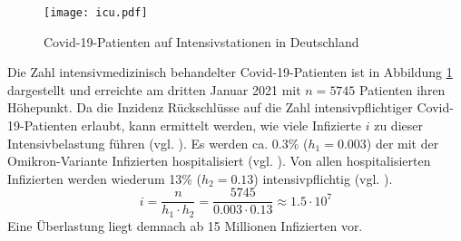 \documentclass[../main.tex]{subfiles}
\begin{document}
    \begin{figure}[b]
        \texttt{[image: icu.pdf]}
        \caption{Covid-19-Patienten auf Intensivstationen in Deutschland}
        \label{fig:icu}
    \end{figure}

    Die Zahl intensivmedizinisch behandelter Covid-19-Patienten ist in Abbildung \ref{fig:icu} dargestellt und erreichte am dritten Januar 2021 mit $n = 5745$ Patienten ihren Höhepunkt. Da die Inzidenz Rückschlüsse auf die Zahl intensivpflichtiger Covid-19-Patienten erlaubt, kann ermittelt werden, wie viele Infizierte $i$ zu dieser Intensivbelastung führen (vgl. \cite[S. 3]{Pri+21}).
    Es werden ca. 0.3\% ($h_1=0.003$) der mit der Omikron-Variante Infizierten hospitalisiert (vgl. \cite[Clinical characteristics]{ECDC22}). Von allen hospitalisierten Infizierten werden wiederum 13\% ($h_2=0.13$) intensivpflichtig (vgl. \cite[S. 148]{Iul22}).
    \begin{equation*}
        i = \frac{n}{h_1 \cdot h_2} = \frac{5745}{0.003 \cdot 0.13} \approx 1.5 \cdot 10^7
    \end{equation*}
    Eine Überlastung liegt demnach ab 15 Millionen Infizierten vor.
\end{document}
